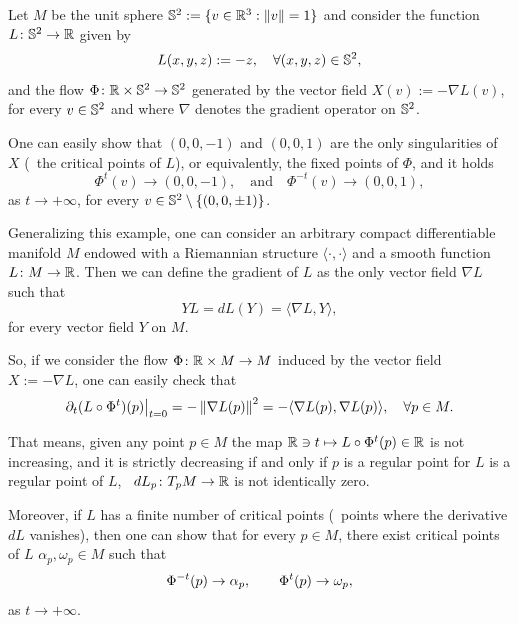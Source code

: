 \begin{example}\label{exam:gradient-flows}
  Let $M$ be the unit sphere $\mathbb{S}^{2}:=\{v\in\mathbb{R}^{3} : \left\|{v}\right\|=1\}$ and consider the function $L\colon\mathbb{S}^{2}\to\mathbb{R}$ given by
  \begin{displaymath}
    L(x,y,z):=-z, \quad\forall (x,y,z)\in\mathbb{S}^{2},
  \end{displaymath}
  and the flow $\Phi\colon\mathbb{R}\times\mathbb{S}^{2}\to\mathbb{S}^{2}$ generated by the vector field $X(v):=-\nabla L(v)$, for every $v\in\mathbb{S}^{2}$ and where $\nabla$ denotes the gradient operator on $\mathbb{S}^{2}$.

  One can easily show that $(0,0,-1)$ and $(0,0,1)$ are the only singularities of $X$ (\ie~the critical points of $L$), or equivalently, the fixed points of $\Phi$, and it holds
  \begin{displaymath}
    \Phi^{t}(v)\to (0,0,-1), \quad\text{and}\quad \Phi^{-t}(v)\to (0,0,1),
  \end{displaymath}
  as $t\to+\infty$, for every $v\in\mathbb{S}^{2}\setminus\{(0,0,\pm 1)\}$.

  Generalizing this example, one can consider an arbitrary compact differentiable manifold $M$ endowed with a Riemannian structure $\langle\cdot,\cdot\rangle$ and a smooth function $L\colon M\to\mathbb{R}$. Then we can define the gradient of $L$ as the only vector field $\nabla L$ such that
  \begin{displaymath}
    YL = dL(Y) =\langle\nabla L, Y\rangle,
  \end{displaymath}
  for every vector field $Y$ on $M$.

  So, if we consider the flow $\Phi\colon\mathbb{R}\times M\to M$ induced by the vector field $X:=-\nabla L$, one can easily check that
  \begin{displaymath}
    \partial_{t} (L\circ\Phi^{t})(p)\big|_{t=0}=-\left\|{\nabla L(p)}\right\|^{2} = -\langle\nabla L(p),\nabla L(p)\rangle,\quad\forall p\in M.
  \end{displaymath}

  That means, given any point $p\in M$ the map $\mathbb{R}\ni t\mapsto L\circ\Phi^{t}(p)\in\mathbb{R}$ is not increasing, and it is strictly decreasing if and only if $p$ is a regular point for $L$ is a regular point of $L$, \ie~$dL_{p}\colon T_{p}M\to\mathbb{R}$ is not identically zero.

  Moreover, if $L$ has a finite number of critical points (\ie~points where the derivative $dL$ vanishes), then one can show that for every $p\in M$, there exist critical points of $L$ $\alpha_{p},\omega_{p}\in M$ such that
  \begin{displaymath}
    \Phi^{-t}(p)\to\alpha_{p}, \quad\text\quad \Phi^{t}(p)\to\omega_{p},
  \end{displaymath}
  as $t\to+\infty$.
\end{example}

